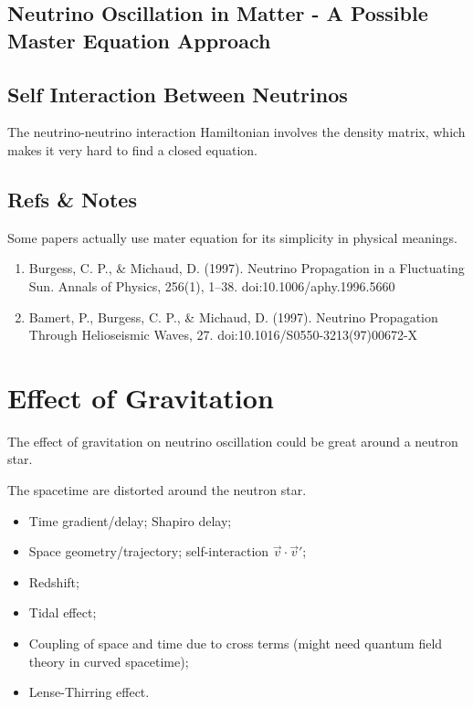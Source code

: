 \documentclass[letterpaper,12pt,english]{sphinxmanual}
\begin{document}
\section{Neutrino Oscillation in Matter - A Possible Master Equation Approach}
\label{mastereqn:neutrino-oscillation-in-matter-a-possible-master-equation-approach}

\section{Self Interaction Between Neutrinos}
\label{mastereqn:self-interaction-between-neutrinos}
The neutrino-neutrino interaction Hamiltonian involves the density matrix, which makes it very hard to find a closed equation.


\section{Refs \& Notes}
\label{mastereqn:refs-notes}
Some papers actually use mater equation for its simplicity in physical meanings.
\begin{enumerate}
\item {} 
Burgess, C. P., \& Michaud, D. (1997). Neutrino Propagation in a Fluctuating Sun. Annals of Physics, 256(1), 1–38. doi:10.1006/aphy.1996.5660

\item {} 
Bamert, P., Burgess, C. P., \& Michaud, D. (1997). Neutrino Propagation Through Helioseismic Waves, 27. doi:10.1016/S0550-3213(97)00672-X

\end{enumerate}


\chapter{Effect of Gravitation}
\label{gravity::doc}\label{gravity:effect-of-gravitation}
The effect of gravitation on neutrino oscillation could be great around a neutron star.

The spacetime are distorted around the neutron star.
\begin{itemize}
\item {} 
Time gradient/delay; Shapiro delay;

\item {} 
Space geometry/trajectory; self-interaction \(\vec v\cdot \vec v'\);

\item {} 
Redshift;

\item {} 
Tidal effect;

\item {} 
Coupling of space and time due to cross terms (might need quantum field theory in curved spacetime);

\item {} 
Lense-Thirring effect.

\end{itemize}
\end{document}
